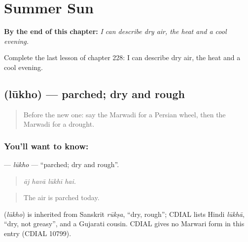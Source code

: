 
\chapter{Summer Sun}
\label{ch:mw-summer-sun}

\begin{chapteropening}
\textbf{By the end of this chapter:} \emph{I can describe dry air, the heat and a cool evening.}

Complete the last lesson of chapter 228: I can describe dry air, the heat and a cool evening.
\end{chapteropening}

\section[\texorpdfstring{\mw{लूखो} (lūkho)}{लूखो (lūkho)}]{ (lūkho) — parched; dry and rough}

\label{lesson:MW-C228-lukho}



\begin{quote}
Before the new one: say the Marwadi for a Persian wheel, then the Marwadi for a drought.
\end{quote}

\subsection*{You'll want to know: }
\textbf{} — \emph{lūkho} — \textquotedblleft{}parched; dry and rough\textquotedblright{}.

\begin{quote}
   
\end{quote}

\begin{quote}
\emph{āj havā lūkhī hai.}
\end{quote}

\begin{quote}
The air is parched today.
\end{quote}

\begin{cousinweb}
\textbf{} (\emph{lūkho}) is inherited from Sanskrit \emph{rūkṣa}, \textquotedblleft{}dry, rough\textquotedblright{}; CDIAL lists Hindi \emph{lūkhā}, \textquotedblleft{}dry, not greasy\textquotedblright{}, and a Gujarati cousin. CDIAL gives no Marwari form in this entry (CDIAL 10799).
\end{cousinweb}


